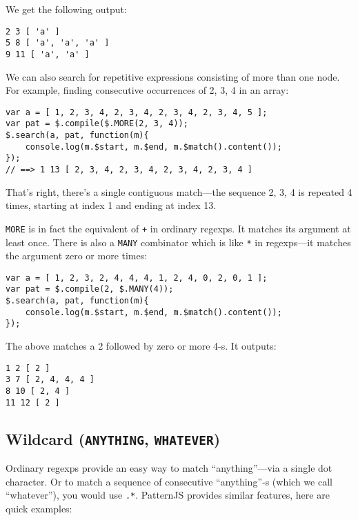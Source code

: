 \documentclass[a4paper,10pt]{article}
\begin{document}
We get the following output:


\begin{verbatim}
2 3 [ 'a' ]
5 8 [ 'a', 'a', 'a' ]
9 11 [ 'a', 'a' ]
\end{verbatim}

We can also search for repetitive expressions consisting of more than one
node.  For example, finding consecutive occurrences of 2, 3, 4 in an array:


\begin{verbatim}
var a = [ 1, 2, 3, 4, 2, 3, 4, 2, 3, 4, 2, 3, 4, 5 ];
var pat = $.compile($.MORE(2, 3, 4));
$.search(a, pat, function(m){
    console.log(m.$start, m.$end, m.$match().content());
});
// ==> 1 13 [ 2, 3, 4, 2, 3, 4, 2, 3, 4, 2, 3, 4 ]
\end{verbatim}

That's right, there's a single contiguous match—the sequence 2, 3, 4 is
repeated 4 times, starting at index 1 and ending at index 13.

\texttt{MORE} is in fact the equivalent of \texttt{+} in ordinary regexps.  It matches its
argument at least once.  There is also a \texttt{MANY} combinator which is like \texttt{*}
in regexps—it matches the argument zero or more times:


\begin{verbatim}
var a = [ 1, 2, 3, 2, 4, 4, 4, 1, 2, 4, 0, 2, 0, 1 ];
var pat = $.compile(2, $.MANY(4));
$.search(a, pat, function(m){
    console.log(m.$start, m.$end, m.$match().content());
});
\end{verbatim}

The above matches a 2 followed by zero or more 4-s.  It outputs:


\begin{verbatim}
1 2 [ 2 ]
3 7 [ 2, 4, 4, 4 ]
8 10 [ 2, 4 ]
11 12 [ 2 ]
\end{verbatim}
\subsection{Wildcard (\texttt{ANYTHING}, \texttt{WHATEVER})}
\label{sec-2-2}


Ordinary regexps provide an easy way to match “anything”—via a single dot
character.  Or to match a sequence of consecutive “anything”-s (which we
call “whatever”), you would use \texttt{.*}.  PatternJS provides similar features,
here are quick examples:
\end{document}
